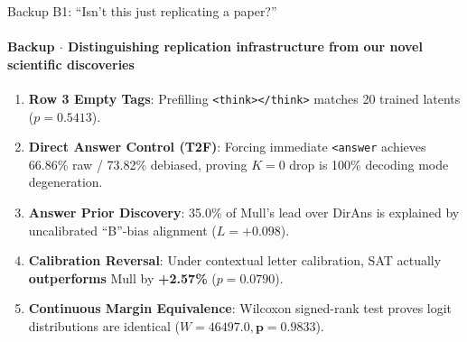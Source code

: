 \documentclass[aspectratio=169, 10pt]{beamer}
\begin{document}
\appendix

\begin{frame}{Backup B1: ``Isn't this just replicating a paper?''}
  \framesubtitle{Backup $\cdot$ Distinguishing replication infrastructure from our novel scientific discoveries}
  
  \begin{tcolorbox}[successcard, title=\textbf{Five Novel Scientific Discoveries (None in Literature)}]
    \small
    \begin{enumerate}\setlength{\itemsep}{3pt}
      \item \textbf{Row 3 Empty Tags}: Prefilling \texttt{<think></think>} matches 20 trained latents ($p = 0.5413$).
      \item \textbf{Direct Answer Control (T2F)}: Forcing immediate \texttt{<answer} achieves 66.86\% raw / 73.82\% debiased, proving $K=0$ drop is 100\% decoding mode degeneration.
      \item \textbf{Answer Prior Discovery}: 35.0\% of Mull's lead over DirAns is explained by uncalibrated ``B''-bias alignment ($L = +0.098$).
      \item \textbf{Calibration Reversal}: Under contextual letter calibration, SAT actually \textbf{outperforms} Mull by \textbf{+2.57\%} ($p = 0.0790$).
      \item \textbf{Continuous Margin Equivalence}: Wilcoxon signed-rank test proves logit distributions are identical ($W=46497.0, \mathbf{p = 0.9833}$).
    \end{enumerate}
  \end{tcolorbox}

\end{frame}
\end{document}
